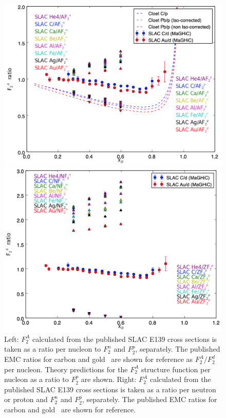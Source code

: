 \documentclass[oneside]{article}
\begin{document}
  \begin{figure}
\begin{minipage}{0.5\textwidth}
 \includegraphics[width=\textwidth]{plots/Anp_data_ratio.png}
\end{minipage}\hfill\begin{minipage}{0.5\textwidth}
 \includegraphics[width=\textwidth]{plots/AZNnp_data_ratio.png}
 \end{minipage}
  \caption[$F_2^A$ ratio to $F_2^n$ and $F_2^p$]{Left: $F_2^A$ calculated from the published SLAC E139 cross sections is taken as a ratio per nucleon to $F_2^n$ and $F_2^p$, separately. The published EMC ratios for carbon and gold~\cite{Malace:2014uea} are shown for reference as $F_2^A/F_2^d$ per nucleon. Theory predictions for the $F_2^A$ structure function per nucleon as a ratio to $F_2^p$ are shown. Right: $F_2^A$ calculated from the published SLAC E139 cross sections is taken as a ratio per neutron or proton and $F_2^n$ and $F_2^p$, separately. The published EMC ratios for carbon and gold~\cite{Malace:2014uea} are shown for reference.}
  \label{fig:data_np_ratio}
\end{figure}  
 
\end{document}
